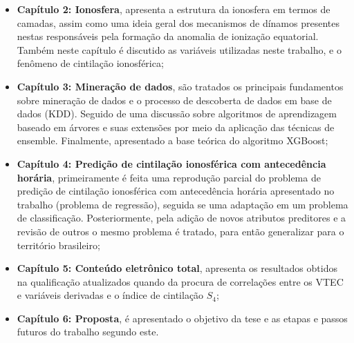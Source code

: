 \begin{itemize}
\item {\bf Capítulo 2: Ionosfera}, apresenta a estrutura da ionosfera em termos de camadas, assim como uma ideia geral dos mecanismos de dínamos presentes nestas responsáveis pela formação da anomalia de ionização equatorial. Também neste capítulo é discutido as variáveis utilizadas neste trabalho, e o fenômeno de cintilação ionosférica;
\item {\bf Capítulo 3: Mineração de dados}, são tratados os principais fundamentos sobre mineração de dados e o processo de descoberta de dados em base de dados (KDD). Seguido de uma discussão sobre algoritmos de aprendizagem baseado em árvores e suas extensões por meio da aplicação das técnicas de ensemble. Finalmente, apresentado a base teórica do algoritmo XGBoost;
\item {\bf Capítulo 4: Predição de cintilação ionosférica com antecedência horária}, primeiramente é feita uma reprodução parcial do problema de predição de cintilação ionosférica com antecedência horária apresentado no trabalho \cite{REZENDE:2009} (problema de regressão), seguida se uma adaptação em um problema de classificação. Posteriormente, pela adição de novos atributos preditores e a revisão de outros o mesmo problema é tratado, para então generalizar para o território brasileiro;
\item {\bf Capítulo 5: Conteúdo eletrônico total}, apresenta os resultados obtidos na qualificação atualizados quando da procura de correlações entre os VTEC e variáveis derivadas e o índice de cintilação $S_4$;
\item {\bf Capítulo 6: Proposta}, é apresentado o objetivo da tese e as etapas e passos futuros do trabalho segundo este.
\end{itemize}
